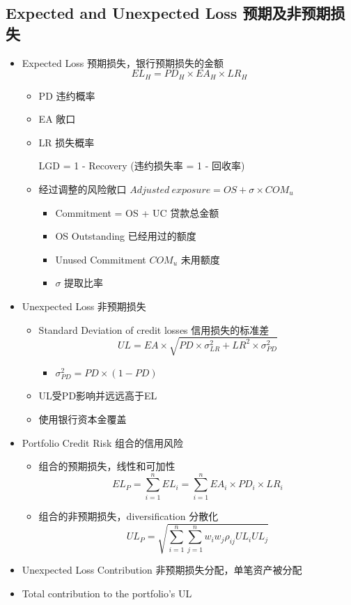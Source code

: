 \documentclass[a4paper,6pt,twoside,openany]{article}
\begin{document}
\subsection{Expected and Unexpected Loss 预期及非预期损失}
\begin{itemize}
\item Expected Loss 预期损失，银行预期损失的金额
  $$EL_H = PD_H \times EA_H \times LR_H$$
  \begin{itemize}
  \item PD 违约概率
  \item EA 敞口
  \item LR 损失概率
    \par LGD = 1 - Recovery (违约损失率 = 1 - 回收率)
  \item 经过调整的风险敞口 $Adjusted\ exposure = OS + \sigma \times COM_u$
    \begin{itemize}
    \item Commitment = OS + UC 贷款总金额
    \item OS Outstanding 已经用过的额度
    \item Unused Commitment $COM_u$ 未用额度
    \item $\sigma$ 提取比率
    \end{itemize}
  \end{itemize}
\item Unexpected Loss 非预期损失
  \begin{itemize}
  \item Standard Deviation of credit losses 信用损失的标准差
    $$UL = EA \times \sqrt{PD \times \sigma_{LR}^2 + LR^2 \times \sigma_{PD}^2}$$
    \begin{itemize}
    \item $\sigma_{PD}^2 = PD \times (1 - PD)$
    \end{itemize}
  \item UL受PD影响并远远高于EL
  \item 使用银行资本金覆盖
  \end{itemize}
\item Portfolio Credit Risk 组合的信用风险
  \begin{itemize}
  \item 组合的预期损失，线性和可加性
    $$EL_P = \sum_{i=1}^n EL_i = \sum_{i=1}^nEA_i \times PD_i \times LR_i$$
  \item 组合的非预期损失，diversification 分散化
    $$UL_P = \sqrt{\sum_{i=1}^n\sum_{j=1}^nw_iw_j\rho_{ij}UL_iUL_j}$$
  \end{itemize}
\item Unexpected Loss Contribution 非预期损失分配，单笔资产被分配
\item Total contribution to the portfolio’s UL
 

\end{itemize}
\end{document}
